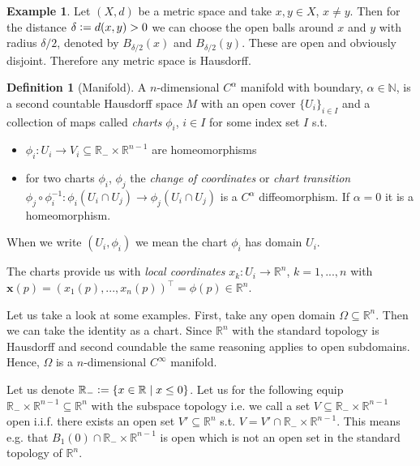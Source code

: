 \documentclass[12pt,a4paper]{article}
\numberwithin{equation}{subsection}
\numberwithin{lemma}{subsection}
\theoremstyle{definition}
\newtheorem{definition}[lemma]{Definition}
\newtheorem{example}[lemma]{Example}
\newcommand{\naturalnum}{\mathbb{N}}
\newcommand{\real}{\mathbb{R}}
\begin{document}
\begin{example}
    Let $(X,d)$ be a metric space and take 
    $x,y \in X$, $x\neq y$. Then for the distance 
    $\delta \vcentcolon= d(x,y) > 0$ we can choose the open balls around $x$ and 
    $y$ with radius 
    $\delta/2$, denoted by $B_{\delta/2}(x)$ and $B_{\delta/2}(y)$. These are 
    open and obviously disjoint. Therefore any metric space is Hausdorff. 
\end{example}

\begin{definition}[Manifold]
    A $n$-dimensional $C^\alpha$ manifold with boundary, $\alpha \in \naturalnum$, 
    is a second countable Hausdorff 
    space $M$ with an open cover $\{ U_i \} _{i\in I}$
    and a collection of maps called \textit{charts} $\phi_i$, $i\in I$ for 
    some index set $I$ s.t.
    \begin{itemize}
        \item $\phi_i: U_i \rightarrow V_i \subseteq \real_- \times \real^{n-1}$
            are homeomorphisms
        \item for two charts $\phi_i$, $\phi_j$ the 
            \textit{change of coordinates} or 
            \textit{chart transition} $\phi_j \circ \phi_i^{-1}: 
            \phi_i(U_i \cap U_j) \rightarrow \phi_j(U_i \cap U_j)$ 
            is a $C^\alpha$ diffeomorphism. If $\alpha=0$ it is a homeomorphism.
    \end{itemize}
    When we write $(U_i, \phi_i)$ we mean the chart $\phi_i$ has domain $U_i$.
\end{definition}
The charts provide us with \textit{local coordinates} $x_k: U_i \rightarrow \real^n$,
$k = 1, ..., n$ with $\mathbf{x}(p) = (x_1(p),...,x_n(p))^\top = \phi(p) \in \real^n$.

Let us take a look at some examples. First, take any open domain 
$\Omega \subseteq \real^n$. Then we can take the identity as a chart.
Since $\real^n$ with the standard topology is Hausdorff and second coundable
the same reasoning applies to open subdomains. Hence, $\Omega$ is a 
$n$-dimensional $C^\infty$ manifold. 

Let us denote $\real_- \vcentcolon= \{ x \in \real \mid x \leq 0 \}$. 
Let us for the following equip $\real_- \times \real^{n-1} \subseteq \real^n$ with the 
subspace topology i.e. we call a set $V \subseteq \real_- \times \real^{n-1}$ 
open i.i.f. there exists an open set $V' \subseteq \real^n$ s.t. 
$V = V' \cap \real_- \times \real^{n-1}$. This means e.g. that 
$B_1(0) \cap \real_- \times \real^{n-1}$ is open which is not an open set 
in the standard topology of $\real^n$.
\end{document}
